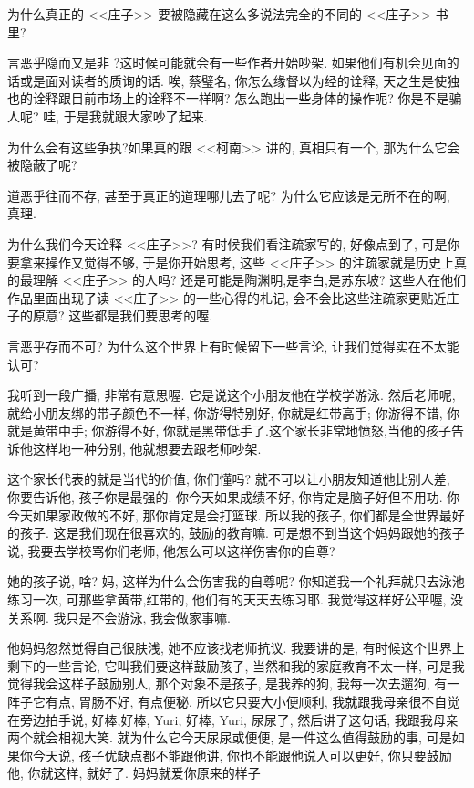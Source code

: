 \documentclass[11pt]{article}
\begin{document}
为什么真正的 <<庄子>> 要被隐藏在这么多说法完全的不同的 <<庄子>> 书里?

{\color{blue} 言恶乎隐而又是非 ?}这时候可能就会有一些作者开始吵架. 如果他们有机会见面的话或是面对读者的质询的话. 唉, 蔡璧名, 你怎么缘督以为经的诠释, 天之生是使独也的诠释跟目前市场上的诠释不一样啊? 怎么跑出一些身体的操作呢? 你是不是骗人呢? 哇, 于是我就跟大家吵了起来. 

为什么会有这些争执?如果真的跟 <<柯南>> 讲的, 真相只有一个, 那为什么它会被隐蔽了呢?


{\color{blue} 道恶乎往而不存,} 甚至于真正的道理哪儿去了呢? 为什么它应该是无所不在的啊, 真理.

为什么我们今天诠释 <<庄子>>? 有时候我们看注疏家写的, 好像点到了, 可是你要拿来操作又觉得不够, 于是你开始思考, 这些 <<庄子>> 的注疏家就是历史上真的最理解 <<庄子>> 的人吗?  还是可能是陶渊明,是李白,是苏东坡? 这些人在他们作品里面出现了读 <<庄子>> 的一些心得的札记, 会不会比这些注疏家更贴近庄子的原意? 这些都是我们要思考的喔.
	

{\color{blue} 言恶乎存而不可?} 为什么这个世界上有时候留下一些言论, 让我们觉得实在不太能认可?

我听到一段广播, 非常有意思喔. 它是说这个小朋友他在学校学游泳. 然后老师呢, 就给小朋友绑的带子颜色不一样, 你游得特别好, 你就是红带高手; 你游得不错, 你就是黄带中手; 你游得不好, 你就是黑带低手了.这个家长非常地愤怒,当他的孩子告诉他这样地一种分别, 他就想要去跟老师吵架.

这个家长代表的就是当代的价值, 你们懂吗? 就不可以让小朋友知道他比别人差, 你要告诉他, 孩子你是最强的. 你今天如果成绩不好, 你肯定是脑子好但不用功. 你今天如果家政做的不好, 那你肯定是会打篮球. 所以我的孩子, 你们都是全世界最好的孩子. 这是我们现在很喜欢的, 鼓励的教育嘛. 可是想不到当这个妈妈跟她的孩子说, 我要去学校骂你们老师, 他怎么可以这样伤害你的自尊?

她的孩子说, 啥? 妈, 这样为什么会伤害我的自尊呢? 你知道我一个礼拜就只去泳池练习一次, 可那些拿黄带,红带的, 他们有的天天去练习耶. 我觉得这样好公平喔, 没关系啊. 我只是不会游泳, 我会做家事嘛.

他妈妈忽然觉得自己很肤浅, 她不应该找老师抗议. 我要讲的是, 有时候这个世界上剩下的一些言论, 它叫我们要这样鼓励孩子, 当然和我的家庭教育不太一样, 可是我觉得我会这样子鼓励别人, 那个对象不是孩子, 是我养的狗, 我每一次去遛狗, 有一阵子它有点, 胃肠不好, 有点便秘, 所以它只要大小便顺利, 我就跟我母亲很不自觉在旁边拍手说, 好棒,好棒, Yuri, 好棒, Yuri, 尿尿了, 然后讲了这句话, 我跟我母亲两个就会相视大笑. 就为什么它今天尿尿或便便, 是一件这么值得鼓励的事, 可是如果你今天说, 孩子优缺点都不能跟他讲, 你也不能跟他说人可以更好, 你只要鼓励他, 你就这样, 就好了. 妈妈就爱你原来的样子
\end{document}
